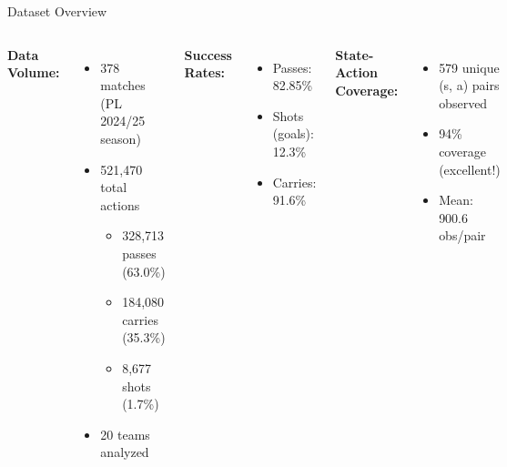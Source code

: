 \documentclass[aspectratio=169]{beamer}
\begin{document}
\begin{frame}{Dataset Overview}
\begin{columns}[T]
\textbf{Data Volume:}
\begin{itemize}
    \item 378 matches (PL 2024/25 season)
    \item 521,470 total actions
    \begin{itemize}
        \item 328,713 passes (63.0\%)
        \item 184,080 carries (35.3\%)
        \item 8,677 shots (1.7\%)
    \end{itemize}
    \item 20 teams analyzed
\end{itemize}

\textbf{Success Rates:}
\begin{itemize}
    \item Passes: 82.85\%
    \item Shots (goals): 12.3\%
    \item Carries: 91.6\%
\end{itemize}

\vspace{0.3cm}
\textbf{State-Action Coverage:}
\begin{itemize}
    \item 579 unique (s, a) pairs observed
    \item 94\% coverage (excellent!)
    \item Mean: 900.6 obs/pair
\end{itemize}
\end{columns}
\end{frame}
\end{document}
